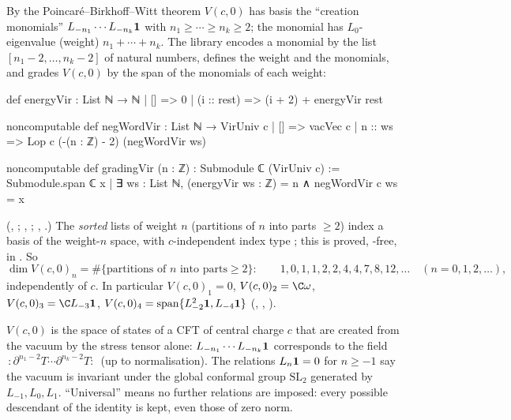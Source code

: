 By the Poincar\'e--Birkhoff--Witt theorem $V(c,0)$ has basis the ``creation monomials''
$L_{-n_1}\cdots L_{-n_k}\mathbf{1}$ with $n_1\ge\cdots\ge n_k\ge2$; the monomial has $L_0$-eigenvalue
(weight) $n_1+\cdots+n_k$. The library encodes a monomial by the list $[n_1-2,\dots,n_k-2]$ of
natural numbers, defines the weight and the monomials, and grades $V(c,0)$ by the span of the
monomials of each weight:
\begin{leancode}
def energyVir : List ℕ → ℕ
  | [] => 0
  | (i :: rest) => (i + 2) + energyVir rest

noncomputable def negWordVir : List ℕ → VirUniv c
  | [] => vacVec c
  | n :: ws => Lop c (-(n : ℤ) - 2) (negWordVir ws)

noncomputable def gradingVir (n : ℤ) : Submodule ℂ (VirUniv c) :=
  Submodule.span ℂ {x | ∃ ws : List ℕ, (energyVir ws : ℤ) = n ∧ negWordVir c ws = x}
\end{leancode}
(, ;
, ;
, .)
The \emph{sorted} lists of weight $n$ (partitions of $n$ into parts $\ge2$) index a basis
 of the weight-$n$ space, with $c$-independent index type
; this is proved, -free, in
. So
\begin{equation*}
 \dim V(c,0)_n = \#\{\text{partitions of $n$ into parts}\ge2\}:\qquad 1,0,1,1,2,2,4,4,7,8,12,\dots
 \quad(n = 0,1,2,\dots),
\end{equation*}
independently of $c$. In particular $V(c,0)_1 = 0$, $V(c,0)_2 = \C\omega$, $V(c,0)_3 = \C L_{-3}\lsevenvac$,
$V(c,0)_4 = \mathrm{span}\{L_{-2}^2\mathbf{1},L_{-4}\mathbf{1}\}$ (,
, ).

\begin{physics}
$V(c,0)$ is the space of states of a CFT of central charge $c$ that are created from the vacuum by the stress
tensor alone: $L_{-n_1}\cdots L_{-n_k}\mathbf{1}$ corresponds to the field $\,{:}\partial^{n_1-2}T\cdots\partial^{n_k-2}T{:}\,$
(up to normalisation). The relations $L_n\mathbf{1}=0$ for $n\ge-1$ say the vacuum is invariant under the global
conformal group $\mathrm{SL}_2$ generated by $L_{-1},L_0,L_1$. ``Universal'' means no further relations are
imposed: every possible descendant of the identity is kept, even those of zero norm.
\end{physics}

